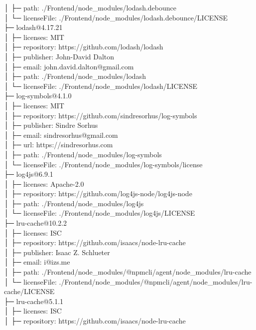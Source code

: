│  ├─ path: ./Frontend/node\_modules/lodash.debounce\\
│  └─ licenseFile: ./Frontend/node\_modules/lodash.debounce/LICENSE\\
├─ lodash@4.17.21\\
│  ├─ licenses: MIT\\
│  ├─ repository: https://github.com/lodash/lodash\\
│  ├─ publisher: John-David Dalton\\
│  ├─ email: john.david.dalton@gmail.com\\
│  ├─ path: ./Frontend/node\_modules/lodash\\
│  └─ licenseFile: ./Frontend/node\_modules/lodash/LICENSE\\
├─ log-symbols@4.1.0\\
│  ├─ licenses: MIT\\
│  ├─ repository: https://github.com/sindresorhus/log-symbols\\
│  ├─ publisher: Sindre Sorhus\\
│  ├─ email: sindresorhus@gmail.com\\
│  ├─ url: https://sindresorhus.com\\
│  ├─ path: ./Frontend/node\_modules/log-symbols\\
│  └─ licenseFile: ./Frontend/node\_modules/log-symbols/license\\
├─ log4js@6.9.1\\
│  ├─ licenses: Apache-2.0\\
│  ├─ repository: https://github.com/log4js-node/log4js-node\\
│  ├─ path: ./Frontend/node\_modules/log4js\\
│  └─ licenseFile: ./Frontend/node\_modules/log4js/LICENSE\\
├─ lru-cache@10.2.2\\
│  ├─ licenses: ISC\\
│  ├─ repository: https://github.com/isaacs/node-lru-cache\\
│  ├─ publisher: Isaac Z. Schlueter\\
│  ├─ email: i@izs.me\\
│  ├─ path: ./Frontend/node\_modules/@npmcli/agent/node\_modules/lru-cache\\
│  └─ licenseFile: ./Frontend/node\_modules/@npmcli/agent/node\_modules/lru-cache/LICENSE\\
├─ lru-cache@5.1.1\\
│  ├─ licenses: ISC\\
│  ├─ repository: https://github.com/isaacs/node-lru-cache\\

